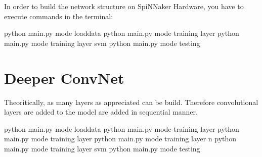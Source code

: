 \documentclass[letterpaper,10pt,english]{sphinxmanual}
\begin{document}
In order to build the network structure on SpiNNaker Hardware, you have to execute commands in the terminal:

\begin{sphinxVerbatim}[commandchars=\\\{\}]
python main.py \PYGZhy{}\PYGZhy{}mode loaddata
python main.py \PYGZhy{}\PYGZhy{}mode training \PYGZhy{}\PYGZhy{}layer 
python main.py \PYGZhy{}\PYGZhy{}mode training \PYGZhy{}\PYGZhy{}layer svm
python main.py \PYGZhy{}\PYGZhy{}mode testing
\end{sphinxVerbatim}


\section{Deeper ConvNet}
\label{\detokenize{samplecode:deeper-convnet}}
Theoritically, as many layers as appreciated can be build. Therefore convolutional layers are added to the model are added in sequential manner.

\begin{sphinxVerbatim}[commandchars=\\\{\}]
   
 
 
 
\end{sphinxVerbatim}

\begin{sphinxVerbatim}[commandchars=\\\{\}]
python main.py \PYGZhy{}\PYGZhy{}mode loaddata
python main.py \PYGZhy{}\PYGZhy{}mode training \PYGZhy{}\PYGZhy{}layer 
python main.py \PYGZhy{}\PYGZhy{}mode training \PYGZhy{}\PYGZhy{}layer 
python main.py \PYGZhy{}\PYGZhy{}mode training \PYGZhy{}\PYGZhy{}layer n
python main.py \PYGZhy{}\PYGZhy{}mode training \PYGZhy{}\PYGZhy{}layer svm
python main.py \PYGZhy{}\PYGZhy{}mode testing
\end{sphinxVerbatim}
\end{document}
